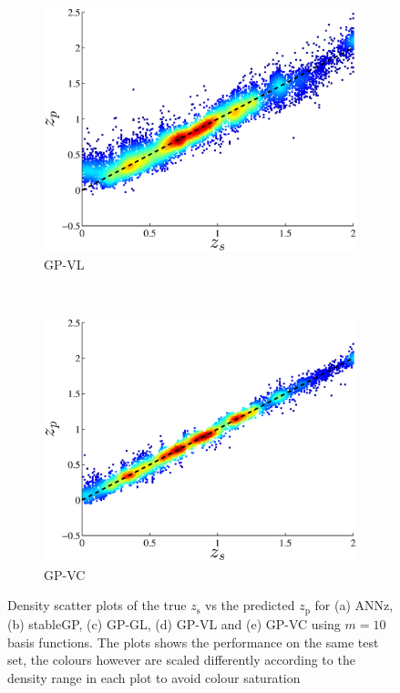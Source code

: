 \documentclass[useAMS,usenatbib,fleqn]{mn2e}
\begin{document}
\begin{figure}
        \begin{subfigure}[b]{0.3\textwidth}
               \includegraphics[width=\textwidth]{figures/GPVL.eps}
                \caption{GP-VL}
                \label{GPVL-plot}
        \end{subfigure}
        ~
        \begin{subfigure}[b]{0.3\textwidth}
                \includegraphics[width=\textwidth]{figures/GPVC.eps}
                \caption{GP-VC}
                \label{GPVC-plot}
        \end{subfigure}
        
        \caption{Density scatter plots of the true $z_\textrm{s}$ vs the predicted $z_\textrm{p}$ for (a) {\sc ANNz}, (b) {\sc stableGP}, (c) GP-GL, (d) GP-VL and (e) GP-VC using $m=10$ basis functions. The plots shows the performance on the same test set, the colours however are scaled differently according to the density range in each plot to avoid colour saturation}
        \label{fig-methods-plots}
\end{figure}
\end{document}

